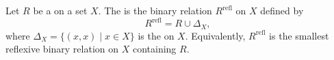 \begin{definition} \label{definition:reflexive_closure_of_a_binary_relation_on_a_set}
Let $R$ be a  on a set $X$. The  is the binary relation $R^{\mathrm{refl}}$ on $X$ defined by
$$
R^{\mathrm{refl}} = R \cup \Delta_X,
$$
where $\Delta_X = \{ (x, x) \mid x \in X \}$ is the  on $X$. Equivalently, $R^{\mathrm{refl}}$ is the smallest reflexive binary relation on $X$ containing $R$.
\end{definition}